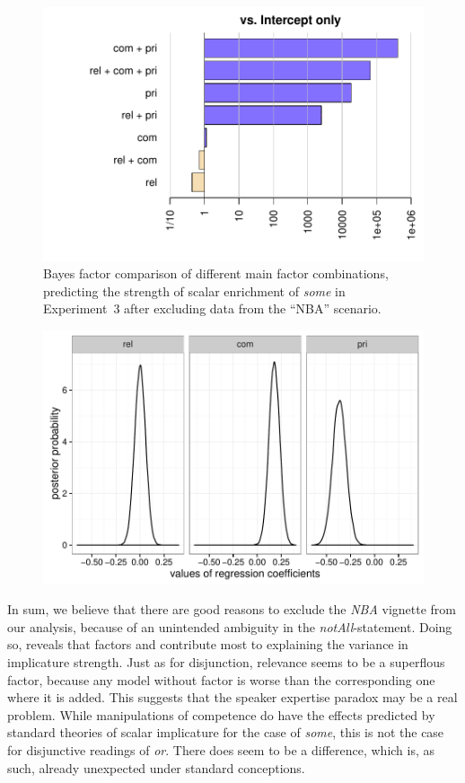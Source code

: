 \documentclass[12pt]{article}
\begin{document}
\begin{figure}
  \centering
  \includegraphics[width = 0.8 \textwidth]{pics/bfsAllExp3_noNBA.pdf}
  \caption{Bayes factor comparison of different main factor combinations, predicting the
    strength of scalar enrichment of \emph{some} in Experiment~3 after excluding data from the
    ``NBA'' scenario.}
  \label{fig:BFsExp3noNBA}
\end{figure}

\begin{figure}
  \centering
  \includegraphics[width = 0.8 \textwidth]{pics/densityMCMCExp3.pdf}
  \caption{}
  \label{fig:BFsExp3noNBA_regressionCoefficients}
\end{figure}

In sum, we believe that there are good reasons to exclude the \emph{NBA} vignette from our
analysis, because of an unintended ambiguity in the \emph{notAll}-statement. Doing so, reveals
that factors \pri and \com contribute most to explaining the variance in implicature
strength. Just as for disjunction, relevance seems to be a superflous factor, because any model
without factor \rel is worse than the corresponding one where it is added. This suggests that
the speaker expertise paradox  may be a real problem. While manipulations of
competence do have the effects predicted by standard theories of scalar implicature for the
case of \emph{some}, this is not the case for disjunctive readings of \emph{or}. There does
seem to be a difference, which is, as such, already unexpected under standard conceptions.
\end{document}
